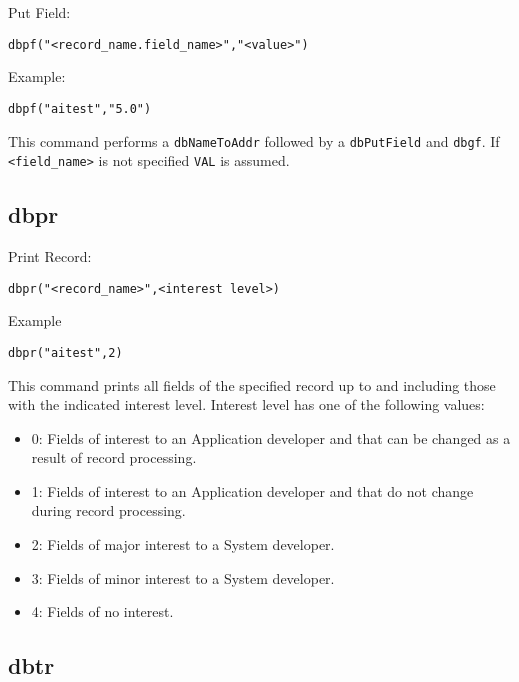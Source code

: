 Put Field:

\begin{verbatim}
dbpf("<record_name.field_name>","<value>")
\end{verbatim}

Example:

\begin{verbatim}
dbpf("aitest","5.0")
\end{verbatim}

This command performs a \verb|dbNameToAddr| followed by a \verb|dbPutField| and \verb|dbgf|. If \verb|<field_name>| is not specified 
\verb|VAL| is assumed. 

\subsection{dbpr}

Print Record:

\begin{verbatim}
dbpr("<record_name>",<interest level>)
\end{verbatim}

Example

\begin{verbatim}
dbpr("aitest",2)
\end{verbatim}

This command prints all fields of the specified record up to and including those with the indicated interest level. Interest 
level has one of the following values:

\begin{itemize}
\item 0:  Fields of interest to an Application developer and that can be changed as a result of record processing.

\item 1:  Fields of interest to an Application developer and that do not change during record processing.

\item 2: Fields of major interest to a System developer.

\item 3: Fields of minor interest to a System developer.

\item 4: Fields of no interest.

\end{itemize}

\subsection{ dbtr}

